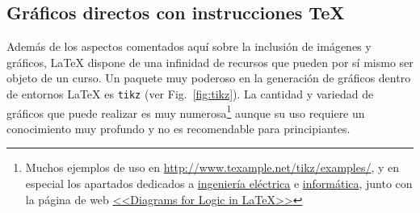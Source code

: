 \documentclass[11pt,a4paper]{article}
\begin{document}
\subsection{Gráficos directos con instrucciones \TeX}
Además de los aspectos comentados aquí sobre la inclusión de imágenes y gráficos, \LaTeX{} dispone de una infinidad de recursos que pueden por sí mismo ser objeto de un curso. Un paquete muy poderoso en la generación de gráficos dentro de entornos \LaTeX{} es \texttt{tikz} (ver Fig.~\ref{fig:tikz}). La cantidad y variedad de gráficos que puede realizar es muy numerosa\footnote{Muchos ejemplos de uso en \url{http://www.texample.net/tikz/examples/}, y en especial los apartados dedicados a \href{http://www.texample.net/tikz/examples/area/electrical-engineering/}{ingeniería eléctrica} e \href{http://www.texample.net/tikz/examples/area/computer-science/}{informática}, junto con la página de web \href{https://www.kleemans.ch/diagrams-for-logic-in-latex}{<<Diagrams for Logic in \LaTeX>>}} aunque su uso requiere un conocimiento muy profundo y no es recomendable para principiantes.
\end{document}
